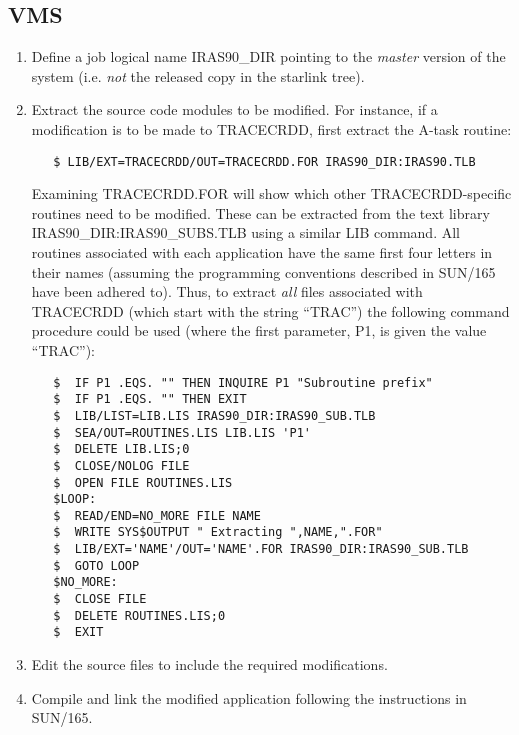 \subsection{VMS}
\begin{enumerate}

\item Define a job logical name {\small IRAS90\_DIR} pointing to the
{\em master} version of the system (i.e. {\em not} the
released copy in the starlink tree).

\item Extract the source code modules to be modified. For instance, if a
modification is to be made to {\small TRACECRDD}, first extract the A-task
routine:

\small
\begin{verbatim}
   $ LIB/EXT=TRACECRDD/OUT=TRACECRDD.FOR IRAS90_DIR:IRAS90.TLB
\end{verbatim}
\normalsize

Examining {\small TRACECRDD.FOR} will show which other {\small
TRACECRDD}-specific routines need to be modified. These can be extracted from
the text library {\small IRAS90\_DIR:IRAS90\_SUBS.TLB} using a similar {\small
LIB} command. All routines associated with each application have the same first
four letters in their names (assuming the programming conventions described in
SUN/165 have been adhered to). Thus, to extract {\em all} files associated with
{\small TRACECRDD} (which start with the string ``TRAC'') the following command
procedure could be used (where the first parameter, P1, is given the value
``{\small TRAC}''):

\small
\begin{verbatim}
   $  IF P1 .EQS. "" THEN INQUIRE P1 "Subroutine prefix"
   $  IF P1 .EQS. "" THEN EXIT
   $  LIB/LIST=LIB.LIS IRAS90_DIR:IRAS90_SUB.TLB
   $  SEA/OUT=ROUTINES.LIS LIB.LIS 'P1'
   $  DELETE LIB.LIS;0
   $  CLOSE/NOLOG FILE
   $  OPEN FILE ROUTINES.LIS
   $LOOP:
   $  READ/END=NO_MORE FILE NAME
   $  WRITE SYS$OUTPUT " Extracting ",NAME,".FOR"
   $  LIB/EXT='NAME'/OUT='NAME'.FOR IRAS90_DIR:IRAS90_SUB.TLB
   $  GOTO LOOP
   $NO_MORE:
   $  CLOSE FILE
   $  DELETE ROUTINES.LIS;0
   $  EXIT
\end{verbatim}
\normalsize

\item Edit the source files to include the required modifications.

\item Compile and link the modified application following the instructions in SUN/165.


\end{enumerate}
